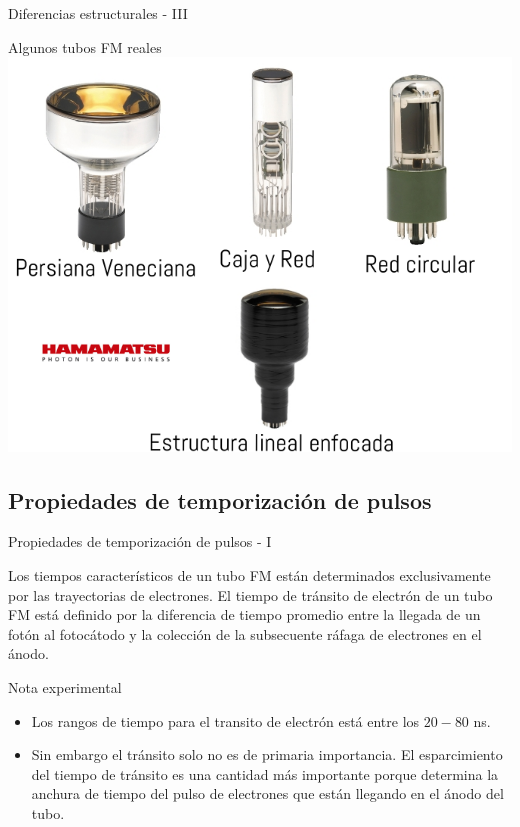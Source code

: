 \documentclass[a4paper,10pt]{beamer}
\begin{document}
\begin{frame}{Diferencias estructurales - III}
 \begin{center}
  \Huge{\color{blue}Algunos tubos FM reales} \\
  \vspace{0.5cm}
 \includegraphics[scale=0.33]{fig21}
 \end{center}
\end{frame}

\subsection{Propiedades de temporización de pulsos}
\begin{frame}{Propiedades de temporización de pulsos - I}

\begin{justify}
Los tiempos característicos de un tubo FM están determinados exclusivamente 
por las trayectorias de electrones. El tiempo de tránsito de electrón de 
un tubo FM está definido por la diferencia de tiempo promedio entre la 
llegada de un fotón al fotocátodo y la colección de la subsecuente ráfaga 
de electrones en el ánodo.
\end{justify}

\begin{exampleblock}{Nota experimental}
 \begin{itemize} [<+->]
  \item \begin{justify}
         Los rangos de tiempo para el transito de electrón está entre los 
         $20-80$ ns. 
        \end{justify}
  \item \begin{justify}
         Sin embargo el tránsito solo no es de primaria importancia. El 
         esparcimiento del tiempo de tránsito es una cantidad más importante 
         porque determina la anchura de tiempo del pulso de electrones 
         que están llegando en el ánodo del tubo.
        \end{justify}
 \end{itemize}
\end{exampleblock}
 
\end{frame}
\end{document}
